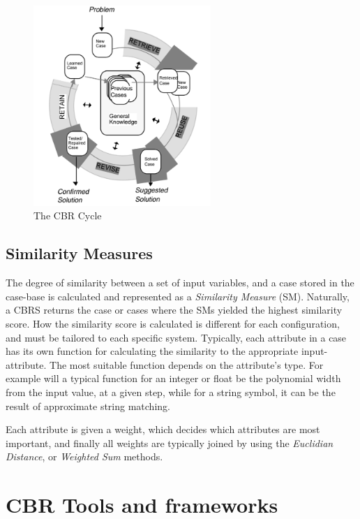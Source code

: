 \begin{figure}[H]
    \centering
    \includegraphics[width=0.6\textwidth]{fig/cbr_cycle.png}
    \caption{The CBR Cycle}
    \label{fig:cbr_cycle}
\end{figure}

\subsection{Similarity Measures}
The degree of similarity between a set of input variables, and a case stored in the case-base is calculated and represented as a \emph{Similarity Measure} (SM). Naturally, a CBRS returns the case or cases where the SMs yielded the highest similarity score. How the similarity score is calculated is different for each configuration, and must be tailored to each specific system. Typically, each attribute in a case has its own function for calculating the similarity to the appropriate input-attribute. The most suitable function depends on the attribute's type. For example will a typical function for an integer or float be the polynomial width from the input value, at a given step, while for a string symbol, it can be the result of approximate string matching. 

Each attribute is given a weight, which decides which attributes are most important, and finally all weights are typically joined by using the \emph{Euclidian Distance}, or \emph{Weighted Sum} methods.

\section{CBR Tools and frameworks}


